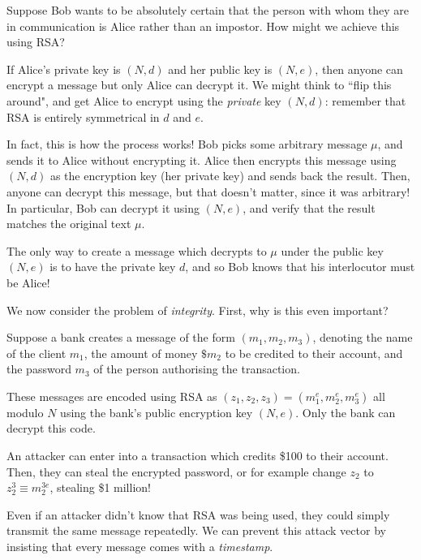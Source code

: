 \documentclass{article}
\begin{document}
Suppose Bob wants to be absolutely certain that the person with whom they are in communication is Alice rather than an impostor. How might we achieve this using RSA?

If Alice's private key is $(N, d)$ and her public key is $(N, e)$, then anyone can encrypt a message but only Alice can decrypt it. We might think to ``flip this around", and get Alice to encrypt using the \textit{private} key $(N, d)$: remember that RSA is entirely symmetrical in $d$ and $e$.

In fact, this is how the process works! Bob picks some arbitrary message $\mu$, and sends it to Alice without encrypting it. Alice then encrypts this message using $(N, d)$ as the encryption key (her private key) and sends back the result. Then, anyone can decrypt this message, but that doesn't matter, since it was arbitrary! In particular, Bob can decrypt it using $(N, e)$, and verify that the result matches the original text $\mu$.

The only way to create a message which decrypts to $\mu$ under the public key $(N, e)$ is to have the private key $d$, and so Bob knows that his interlocutor must be Alice!

We now consider the problem of \textit{integrity}. First, why is this even important?

\begin{remark}
	\label{remark-homomorphism-attack}
    Suppose a bank creates a message of the form $(m_1, m_2, m_3)$, denoting the name of the client $m_1$, the amount of money $\$m_2$ to be credited to their account, and the password $m_3$ of the person authorising the transaction.
    
    These messages are encoded using RSA as $(z_1, z_2, z_3) = (m_1^e, m_2^e, m_3^e)$ all modulo $N$ using the bank's public encryption key $(N, e)$. Only the bank can decrypt this code.
    
    An attacker can enter into a transaction which credits \$100 to their account. Then, they can steal the encrypted password, or for example change $z_2$ to $z_2^3 \equiv m_2^{3e}$, stealing \$1 million!
\end{remark}

\begin{note}
	Even if an attacker didn't know that RSA was being used, they could simply transmit the same message repeatedly. We can prevent this attack vector by insisting that every message comes with a \textit{timestamp}.
\end{note}
\end{document}
